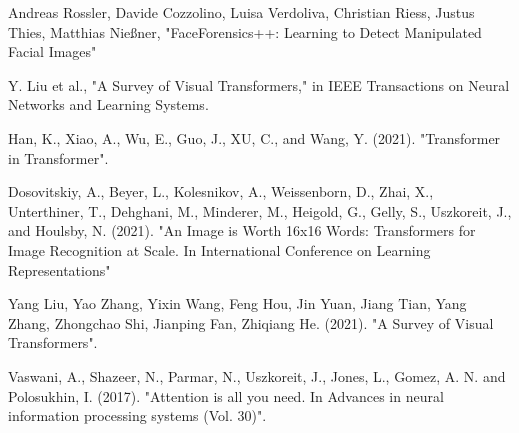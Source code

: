 \begin{thebibliography}{99}

     Andreas Rossler, Davide Cozzolino, Luisa Verdoliva, Christian Riess, Justus Thies, Matthias Nießner, "FaceForensics++: Learning to Detect Manipulated Facial Images"










     Y. Liu et al., "A Survey of Visual Transformers," in IEEE Transactions on Neural Networks and Learning Systems.

     Han, K., Xiao, A., Wu, E., Guo, J., XU, C., and Wang, Y. (2021). "Transformer in Transformer". 

     Dosovitskiy, A., Beyer, L., Kolesnikov, A., Weissenborn, D., Zhai, X., Unterthiner, T., Dehghani, M., Minderer, M., Heigold, G., Gelly, S., Uszkoreit, J., and Houlsby, N. (2021). "An Image is Worth 16x16 Words: Transformers for Image Recognition at Scale. In International Conference on Learning Representations"

     Yang Liu, Yao Zhang, Yixin Wang, Feng Hou, Jin Yuan,
    Jiang Tian, Yang Zhang, Zhongchao Shi, Jianping Fan, Zhiqiang He. (2021). "A Survey of Visual Transformers".

     Vaswani, A., Shazeer, N., Parmar, N., Uszkoreit, J., Jones, L., Gomez, A. N. and Polosukhin, I. (2017). "Attention is all you need. In Advances in neural information processing systems (Vol. 30)".
\end{thebibliography}
